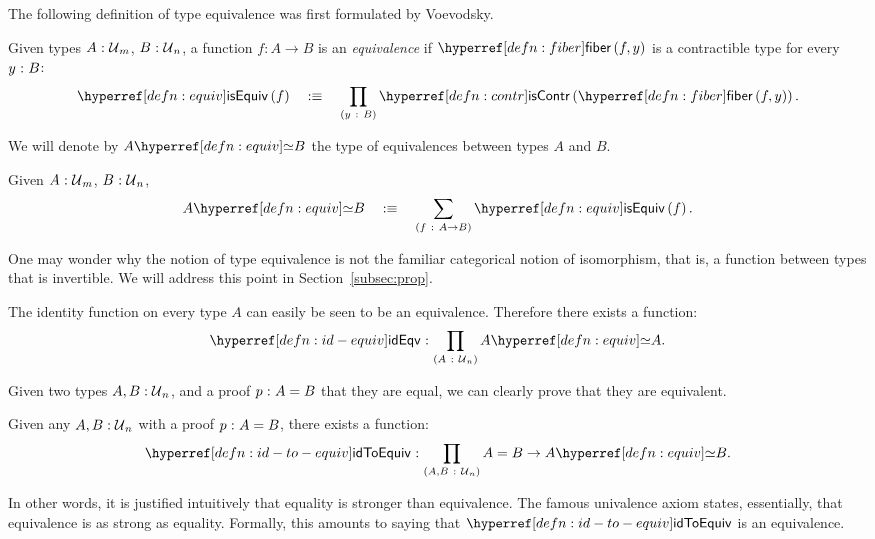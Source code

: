 The following definition of type equivalence was first formulated by Voevodsky.
\begin{defn}[Equivalence]\label{defn:equiv}
  Given types $A\hspace{0.1mm}:\hspace{0.1mm}\mathcal{U}{}_m$, $B\hspace{0.1mm}:\hspace{0.1mm}\mathcal{U}{}_n$, a function $f : A \rightarrow B$ is an
  \emph{equivalence} if $\fiber{f}{y}$ is a contractible type for every $y\hspace{0.1mm}:\hspace{0.1mm}B$:
  \begin{equation*}
    \isequiv{f} \quad\is\quad \pity{y}{B}{\iscontr{\fiber{f}{y}}}.
  \end{equation*}
\end{defn}

We will denote by $\typequiv{A}{B}$ the type of equivalences between types $A$ and $B$.
\begin{defn}
  Given $A\hspace{0.1mm}:\hspace{0.1mm}\mathcal{U}{}_m$, $B\hspace{0.1mm}:\hspace{0.1mm}\mathcal{U}{}_n$,
  \begin{equation*}
    \typequiv{A}{B} \quad\is\quad \sigmaty{f}{A \rightarrow B}{\isequiv{f}}.
  \end{equation*}
\end{defn}

One may wonder why the notion of type equivalence is not the familiar categorical notion
of isomorphism, that is, a function between types that is invertible. We will address this
point in Section~\ref{subsec:prop}.

\begin{defn}\label{defn:id-equiv}
  The identity function on every type $A$ can easily be seen to be an equivalence.
  Therefore there exists a function:
  \begin{equation*}
    \oftyI{\idequivnm}{\pity{A}{\univ{}_n}{\typequiv{A}{A}}}.
  \end{equation*}
\end{defn}

Given two types $A, B:\mathcal{U}{}_n$, and a proof $p\hspace{0.1mm}:\hspace{0.1mm}A = B$ that they are
equal, we can clearly prove that they are equivalent.
\begin{defn}\label{defn:id-to-equiv}
  Given any $A, B:\mathcal{U}{}_n$ with a proof $p\hspace{0.1mm}:\hspace{0.1mm}A = B$, there exists a
  function:
  \begin{equation*}
    \oftyI{\idtoeqvnm{}}{\pity{A, B}{\univ{}_n}{A = B \rightarrow \typequiv{A}{B}}}.
  \end{equation*}
\end{defn}

In other words, it is justified intuitively that equality is stronger than equivalence.
The famous univalence axiom states, essentially, that equivalence is as strong as
equality. Formally, this amounts to saying that $\idtoeqvnm{}$ is an equivalence.

